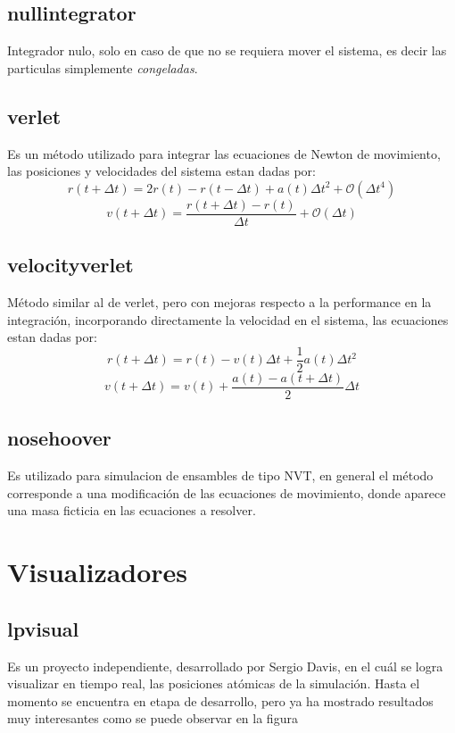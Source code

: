 \subsection{nullintegrator}
Integrador nulo, solo en caso de que no se requiera mover el sistema, es decir las particulas simplemente \textit{congeladas}.
\subsection{verlet}
Es un m\'etodo utilizado para integrar las ecuaciones de Newton de movimiento, las posiciones y velocidades del sistema estan dadas por:
$$r(t+\Delta t) = 2r(t) - r(t-\Delta t) + a(t)\Delta t^2 + \mathcal{O}(\Delta t^4)$$
$$v(t+\Delta t) = \frac{r(t+\Delta t) - r(t)}{\Delta t} + \mathcal{O}(\Delta t)$$
\subsection{velocityverlet}
M\'etodo similar al de verlet, pero con mejoras respecto a la performance en la integraci\'on, incorporando directamente la velocidad en el sistema, las ecuaciones estan dadas por:
$$r(t+\Delta t) = r(t) - v(t)\Delta t + \frac{1}{2}a(t)\Delta t^2$$
$$v(t+\Delta t) = v(t) + \frac{a(t) - a(t + \Delta t)}{2}\Delta t$$
\subsection{nosehoover}
Es utilizado para simulacion de ensambles de tipo NVT, en general el m\'etodo corresponde a una modificaci\'on de las ecuaciones de movimiento, donde aparece una masa ficticia en las ecuaciones a resolver.

\section{Visualizadores}
\subsection{lpvisual}
Es un proyecto independiente, desarrollado por Sergio Davis, en el cu\'al se logra visualizar en tiempo real, las posiciones at\'omicas de la simulaci\'on. Hasta el momento se encuentra en etapa de desarrollo, pero ya ha mostrado resultados muy interesantes como se puede observar en la figura

